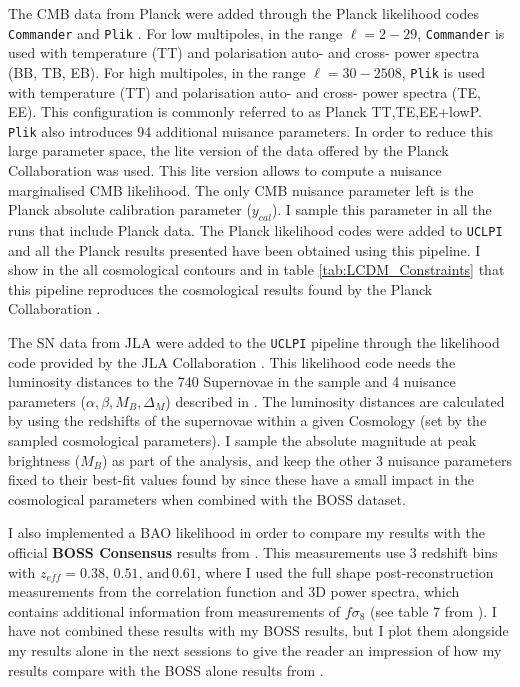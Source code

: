 \qquad The CMB data from Planck were added through the Planck likelihood codes \texttt{Commander} and \texttt{Plik} \citep{PlanckLikelihood2015}. For low multipoles, in the range $\ell=2-29$, \texttt{Commander} is used with temperature (TT) and polarisation auto- and cross- power spectra (BB, TB, EB). For high multipoles, in the range $\ell=30-2508$, \texttt{Plik} is used with temperature (TT) and polarisation auto- and cross- power spectra (TE, EE). This configuration is commonly referred to as Planck TT,TE,EE+lowP. \texttt{Plik} also introduces 94 additional nuisance parameters. In order to reduce this large parameter space, the lite version of the data offered by the Planck Collaboration was used. This lite version allows to compute a nuisance marginalised CMB likelihood. The only CMB nuisance parameter left is the Planck absolute calibration parameter ($y_{cal}$). I sample this parameter in all the runs that include Planck data. The Planck likelihood codes were added to \texttt{UCLPI} and all the Planck results presented have been obtained using this pipeline. I show in the all cosmological contours and in table \ref{tab:LCDM_Constraints} that this pipeline reproduces the cosmological results found by the Planck Collaboration \citep{PlanckCosmology2016}.

\qquad The SN data from JLA were added to the \texttt{UCLPI} pipeline through the likelihood code provided by the JLA Collaboration \citep{JLAdata}. This likelihood code needs the luminosity distances to the 740 Supernovae in the sample and 4 nuisance parameters ($\alpha, \beta, M_B, \Delta_M$) described in \cite{JLAdata}. The luminosity distances are calculated by \class \citep{Class} using the redshifts of the supernovae within a given Cosmology (set by the sampled cosmological parameters). I sample the absolute magnitude at peak brightness ($M_B$) as part of the analysis, and keep the other 3 nuisance parameters fixed to their best-fit values found by \cite{JLAdata} since these have a small impact in the cosmological parameters when combined with the BOSS dataset.

\qquad I also implemented a BAO likelihood in order to compare my results with the official \textbf{BOSS Consensus} results from \cite{2016BOSSCosmology}. This measurements use 3 redshift bins with $z_{eff} = 0.38, \, 0.51, \, \text{and} \, 0.61 $, where I used the full shape post-reconstruction measurements from the correlation function and 3D power spectra, which contains additional information from measurements of $f\sigma_8$ (see table 7 from \cite{2016BOSSCosmology}). I have not combined these results with my BOSS results, but I plot them alongside my results alone in the next sessions to give the reader an impression of how my results compare with the BOSS alone results from \cite{2016BOSSCosmology}.


